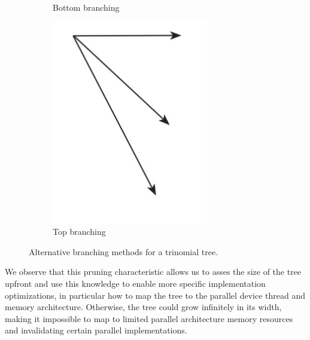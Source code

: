 \begin{figure}
\begin{subfigure}{.3\textwidth}
  \caption{Bottom branching}
  \label{fig:background:altbranchingbottom}
\end{subfigure}
\begin{subfigure}{.3\textwidth}
  \centering
  \includegraphics[width=.7\linewidth]{img/topbranch.jpg}
  \caption{Top branching}
  \label{fig:background:altbranchingtop}
\end{subfigure}
\caption{Alternative branching methods for a trinomial tree.}
\label{fig:background:allbranchings}
\end{figure}

We observe that this pruning characteristic allows us to asses the size of the tree upfront and use this knowledge to enable more specific implementation optimizations, in particular how to map the tree to the parallel device thread and memory architecture. Otherwise, the tree could grow infinitely in its width, making it impossible to map to limited parallel architecture memory resources and invalidating certain parallel implementations.

